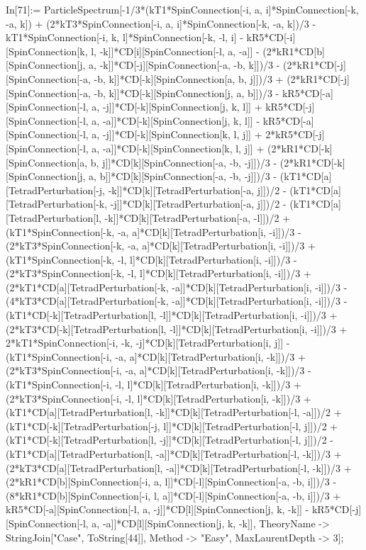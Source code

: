 In[71]:= ParticleSpectrum[-1/3*(kT1*SpinConnection[-i, a, i]*SpinConnection[-k, -a, k]) + (2*kT3*SpinConnection[-i, a, i]*SpinConnection[-k, -a, k])/3 - kT1*SpinConnection[-i, k, l]*SpinConnection[-k, -l, i] - kR5*CD[-i][SpinConnection[k, l, -k]]*CD[i][SpinConnection[-l, a, -a]] - (2*kR1*CD[b][SpinConnection[j, a, -k]]*CD[-j][SpinConnection[-a, -b, k]])/3 - (2*kR1*CD[-j][SpinConnection[-a, -b, k]]*CD[-k][SpinConnection[a, b, j]])/3 + (2*kR1*CD[-j][SpinConnection[-a, -b, k]]*CD[-k][SpinConnection[j, a, b]])/3 - kR5*CD[-a][SpinConnection[-l, a, -j]]*CD[-k][SpinConnection[j, k, l]] + kR5*CD[-j][SpinConnection[-l, a, -a]]*CD[-k][SpinConnection[j, k, l]] - kR5*CD[-a][SpinConnection[-l, a, -j]]*CD[-k][SpinConnection[k, l, j]] + 2*kR5*CD[-j][SpinConnection[-l, a, -a]]*CD[-k][SpinConnection[k, l, j]] + (2*kR1*CD[-k][SpinConnection[a, b, j]]*CD[k][SpinConnection[-a, -b, -j]])/3 - (2*kR1*CD[-k][SpinConnection[j, a, b]]*CD[k][SpinConnection[-a, -b, -j]])/3 - (kT1*CD[a][TetradPerturbation[-j, -k]]*CD[k][TetradPerturbation[-a, j]])/2 - (kT1*CD[a][TetradPerturbation[-k, -j]]*CD[k][TetradPerturbation[-a, j]])/2 - (kT1*CD[a][TetradPerturbation[l, -k]]*CD[k][TetradPerturbation[-a, -l]])/2 + (kT1*SpinConnection[-k, -a, a]*CD[k][TetradPerturbation[i, -i]])/3 - (2*kT3*SpinConnection[-k, -a, a]*CD[k][TetradPerturbation[i, -i]])/3 + (kT1*SpinConnection[-k, -l, l]*CD[k][TetradPerturbation[i, -i]])/3 - (2*kT3*SpinConnection[-k, -l, l]*CD[k][TetradPerturbation[i, -i]])/3 + (2*kT1*CD[a][TetradPerturbation[-k, -a]]*CD[k][TetradPerturbation[i, -i]])/3 - (4*kT3*CD[a][TetradPerturbation[-k, -a]]*CD[k][TetradPerturbation[i, -i]])/3 - (kT1*CD[-k][TetradPerturbation[l, -l]]*CD[k][TetradPerturbation[i, -i]])/3 + (2*kT3*CD[-k][TetradPerturbation[l, -l]]*CD[k][TetradPerturbation[i, -i]])/3 + 2*kT1*SpinConnection[-i, -k, -j]*CD[k][TetradPerturbation[i, j]] - (kT1*SpinConnection[-i, -a, a]*CD[k][TetradPerturbation[i, -k]])/3 + (2*kT3*SpinConnection[-i, -a, a]*CD[k][TetradPerturbation[i, -k]])/3 - (kT1*SpinConnection[-i, -l, l]*CD[k][TetradPerturbation[i, -k]])/3 + (2*kT3*SpinConnection[-i, -l, l]*CD[k][TetradPerturbation[i, -k]])/3 + (kT1*CD[a][TetradPerturbation[l, -k]]*CD[k][TetradPerturbation[-l, -a]])/2 + (kT1*CD[-k][TetradPerturbation[-j, l]]*CD[k][TetradPerturbation[-l, j]])/2 + (kT1*CD[-k][TetradPerturbation[l, -j]]*CD[k][TetradPerturbation[-l, j]])/2 - (kT1*CD[a][TetradPerturbation[l, -a]]*CD[k][TetradPerturbation[-l, -k]])/3 + (2*kT3*CD[a][TetradPerturbation[l, -a]]*CD[k][TetradPerturbation[-l, -k]])/3 + (2*kR1*CD[b][SpinConnection[-i, a, l]]*CD[-l][SpinConnection[-a, -b, i]])/3 - (8*kR1*CD[b][SpinConnection[-i, l, a]]*CD[-l][SpinConnection[-a, -b, i]])/3 + kR5*CD[-a][SpinConnection[-l, a, -j]]*CD[l][SpinConnection[j, k, -k]] - kR5*CD[-j][SpinConnection[-l, a, -a]]*CD[l][SpinConnection[j, k, -k]], TheoryName -> StringJoin["Case", ToString[44]], Method -> "Easy", MaxLaurentDepth -> 3]; 